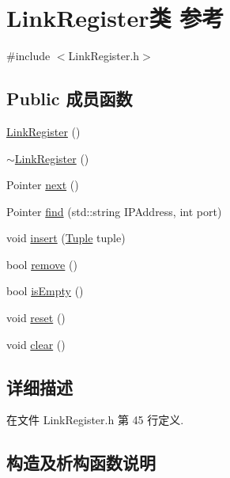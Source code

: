 \hypertarget{class_link_register}{}\section{Link\+Register类 参考}
\label{class_link_register}


{\ttfamily \#include $<$Link\+Register.\+h$>$}

\subsection*{Public 成员函数}
\begin{DoxyCompactItemize}
\item 
\hyperlink{class_link_register_a0bfea076828afd624b1f04c2e68b0ad8}{Link\+Register} ()
\item 
\hyperlink{class_link_register_a0e78844a8ababa2284571a62e421871f}{$\sim$\+Link\+Register} ()
\item 
Pointer \hyperlink{class_link_register_a43763a33de2304f53bfd11e7d3e90491}{next} ()
\item 
Pointer \hyperlink{class_link_register_abe4840e598dc18dee95cd979513160aa}{find} (std\+::string I\+P\+Address, int port)
\item 
void \hyperlink{class_link_register_a937e313ea63312bd9636c978554e180c}{insert} (\hyperlink{class_tuple}{Tuple} tuple)
\item 
bool \hyperlink{class_link_register_ac894e7263eeeeb67bc6cfa8f37c18713}{remove} ()
\item 
bool \hyperlink{class_link_register_a5770b48622c38dadecca356406b6ed47}{is\+Empty} ()
\item 
void \hyperlink{class_link_register_aac227d321f4fed2ebd7b661eb554604b}{reset} ()
\item 
void \hyperlink{class_link_register_a1af4133a7b637815860d3efb4e84d3f3}{clear} ()
\end{DoxyCompactItemize}


\subsection{详细描述}


在文件 Link\+Register.\+h 第 45 行定义.



\subsection{构造及析构函数说明}
\mbox{\label{class_link_register_a0bfea076828afd624b1f04c2e68b0ad8}} 
